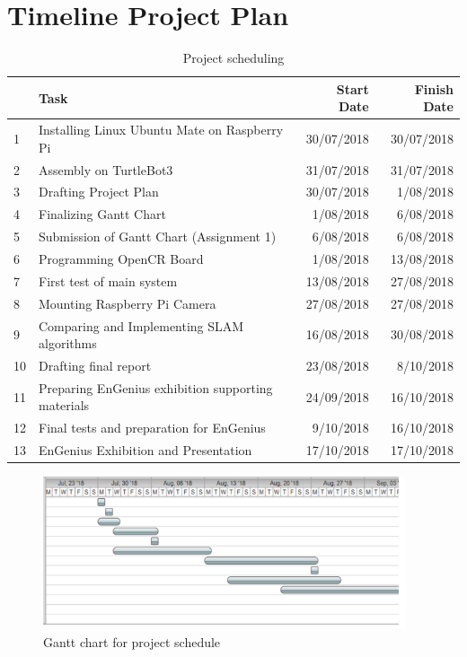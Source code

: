 \documentclass[12pt]{report}
\begin{document}
\chapter{Timeline Project Plan}
\begin{table}[H]
\centering
\begin{tabular}{|l|l|r|r|}
\toprule
              & \textbf{Task}                     & \textbf{Start Date}   & \textbf{Finish Date} \\
\midrule
1 & Installing Linux Ubuntu Mate on Raspberry Pi                  & 30/07/2018    & 30/07/2018                           \\ \hline
2 & Assembly on TurtleBot3       
            & 31/07/2018    & 31/07/2018            
              \\ \hline
3 & Drafting Project Plan
            & 30/07/2018    & 1/08/2018                 \\ \hline
4 & Finalizing Gantt Chart
            & 1/08/2018     & 6/08/2018                 \\ \hline
5 & Submission of Gantt Chart (Assignment 1)                      & 6/08/2018     & 6/08/2018                             \\ \hline
6 & Programming OpenCR Board
            & 1/08/2018     & 13/08/2018
              \\ \hline
7 & First test of main system
            & 13/08/2018    & 27/08/2018
              \\ \hline
8 & Mounting Raspberry Pi Camera 
            & 27/08/2018    & 27/08/2018
              \\ \hline
9 & Comparing and Implementing SLAM algorithms
            & 16/08/2018    & 30/08/2018                \\ \hline
10 & Drafting final report
            & 23/08/2018    & 8/10/2018
              \\ \hline
11 & Preparing EnGenius exhibition supporting materials   & 24/09/2018    & 16/10/2018                            \\ \hline
12 & Final tests and preparation for EnGenius                     & 9/10/2018     & 16/10/2018                            \\ \hline
13 & EnGenius Exhibition and Presentation 
            & 17/10/2018    & 17/10/2018
              \\ \hline
\bottomrule
\end{tabular}
\label{tab:Table 7.1}
\caption{Project scheduling}
\end{table}
\begin{figure}[H]
        \centering
        \includegraphics[width=0.95\textwidth]{Fig17.png}
        \caption{Gantt chart for project schedule}
        \label{fig:17}
\end{figure}
\end{document}
